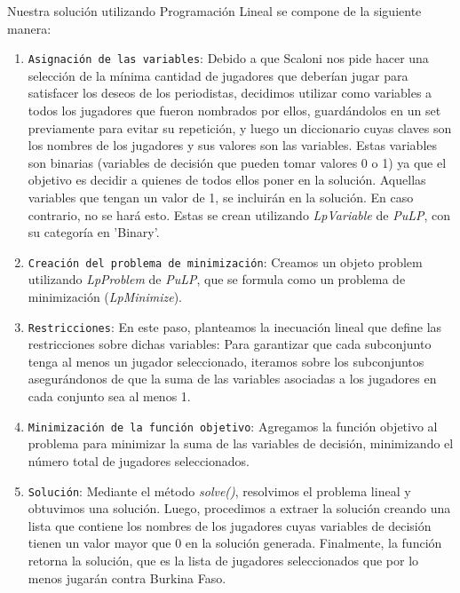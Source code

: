 Nuestra solución utilizando Programación Lineal se compone de la siguiente manera:
\begin{enumerate}
    \item \texttt{Asignación de las variables}: Debido a que Scaloni nos pide hacer una selección de la mínima cantidad de jugadores que deberían jugar para satisfacer los deseos de los periodistas, decidimos utilizar como variables a todos los jugadores que fueron nombrados por ellos, guardándolos en un set previamente para evitar su repetición, y luego un diccionario cuyas claves son los nombres de los jugadores y sus valores son las variables. Estas variables son binarias (variables de decisión que pueden tomar valores 0 o 1) ya que el objetivo es decidir a quienes de todos ellos poner en la solución. Aquellas variables que tengan un valor de 1, se incluirán en la solución. En caso contrario, no se hará esto. Estas se crean utilizando \textit{LpVariable} de \textit{PuLP}, con su categoría en 'Binary'.

    \item \texttt{Creación del problema de minimización}: Creamos un objeto problem utilizando \textit{LpProblem} de \textit{PuLP}, que se formula como un problema de minimización (\textit{LpMinimize}).

    \item \texttt{Restricciones}: En este paso, planteamos la inecuación lineal que define las restricciones sobre dichas variables:
   	 Para garantizar que cada subconjunto tenga al menos un jugador seleccionado, iteramos sobre los subconjuntos asegurándonos de que la suma de las variables asociadas a los jugadores en cada conjunto sea al menos 1.

    \item \texttt{Minimización de la función objetivo}: Agregamos la función objetivo al problema para minimizar la suma de las variables de decisión, minimizando el número total de jugadores seleccionados.

    \item \texttt{Solución}: Mediante el método \textit{solve()}, resolvimos el problema lineal y obtuvimos una solución.    Luego, procedimos a extraer la solución creando una lista que contiene los nombres de los jugadores cuyas variables de decisión tienen un valor mayor que 0 en la solución generada.
    Finalmente, la función retorna la solución, que es la lista de jugadores seleccionados que por lo menos jugarán contra Burkina Faso.
\end{enumerate}

